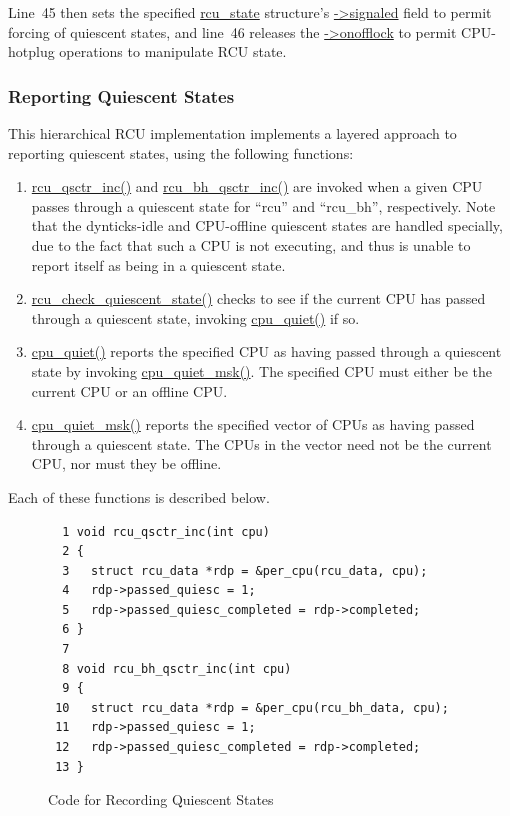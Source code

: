 Line~45 then sets the specified \url{rcu_state} structure's \url{->signaled}
field to permit forcing of quiescent states, and
line~46 releases the \url{->onofflock} to permit CPU-hotplug
operations to manipulate RCU state.

\subsubsection{Reporting Quiescent States}
\label{app:rcuimpl:rcutreewt:Reporting Quiescent States}

This hierarchical RCU implementation implements a layered approach
to reporting quiescent states, using the following functions:
\begin{enumerate}
\item	\url{rcu_qsctr_inc()} and \url{rcu_bh_qsctr_inc()}
	are invoked when a given CPU passes through a
	quiescent state for ``rcu'' and ``rcu\_bh'', respectively.
	Note that the dynticks-idle and CPU-offline quiescent states
	are handled specially, due to the fact that such a CPU
	is not executing, and thus is unable to report itself as
	being in a quiescent state.
\item	\url{rcu_check_quiescent_state()} checks to see if the current
	CPU has passed through a quiescent state, invoking \url{cpu_quiet()}
	if so.
\item	\url{cpu_quiet()} reports the specified CPU as having passed
	through a quiescent state by invoking \url{cpu_quiet_msk()}.
	The specified CPU must either be the current CPU or an offline CPU.
\item	\url{cpu_quiet_msk()} reports the specified vector of CPUs as
	having passed through a quiescent state.  The CPUs in the
	vector need not be the current CPU, nor must they be offline.
\end{enumerate}

Each of these functions is described below.

\begin{figure}[tbp]
{ \scriptsize
\begin{verbatim}
  1 void rcu_qsctr_inc(int cpu)
  2 {
  3   struct rcu_data *rdp = &per_cpu(rcu_data, cpu);
  4   rdp->passed_quiesc = 1;
  5   rdp->passed_quiesc_completed = rdp->completed;
  6 }
  7 
  8 void rcu_bh_qsctr_inc(int cpu)
  9 {
 10   struct rcu_data *rdp = &per_cpu(rcu_bh_data, cpu);
 11   rdp->passed_quiesc = 1;
 12   rdp->passed_quiesc_completed = rdp->completed;
 13 }
\end{verbatim}
}
\caption{Code for Recording Quiescent States}
\label{fig:app:rcuimpl:rcutreewt:Code for Recording Quiescent States}
\end{figure}

